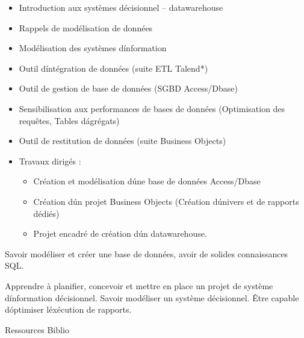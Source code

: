 \vfill

{
\begin{itemize} 
\item Introduction aux systèmes décisionnel – datawarehouse
\item Rappels de modélisation de données
\item Modélisation des systèmes d\'information
\item Outil d\'intégration de données (suite ETL Talend*)
\item Outil de gestion de base de données (SGBD Access/Dbase)
\item Sensibilisation aux performances de bases de données (Optimisation des requêtes, Tables d\'agrégats)
\item Outil de restitution de données (suite Business Objects)
\item Travaux dirigés :
  \begin{itemize} 
  \item Création et modélisation d\'une base de données Access/Dbase
  \item Création d\'un projet Business Objects (Création d\'univers et de rapports dédiés)
  \item Projet encadré de création d\'un datawarehouse.
  \end{itemize} 
\end{itemize} 
} 
{Savoir modéliser et créer une base de données, avoir de solides connaissances SQL.} 
{\begin{itemize} 
  \ObjItem Apprendre à planifier, concevoir et mettre en place un projet de système d\'information décisionnel.
  \ObjItem Savoir modéliser un système décisionnel.
  \ObjItem Être capable d\'optimiser l\'exécution de rapports.
\end{itemize} 
} 
{Ressources} 
{Biblio} 
 
